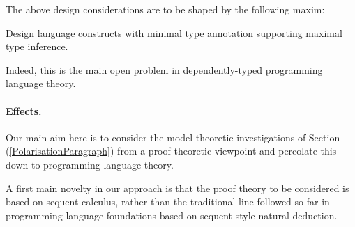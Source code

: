 \documentclass[11pt,twocolumn]{article}
\newcounter{CC}
\newenvironment{resenumerate}
  {\begin{list}{[\textbf{\arabic{CC}]}}
  {\usecounter{CC}
   \setlength{\topsep}{2pt}
   \setlength{\partopsep}{2pt}
   \setlength{\itemsep}{2.5pt}
   \setlength{\parsep}{2.5pt}
   \setlength{\leftmargin}{1.65em}
   \setlength{\labelwidth}{1.15em}
 }}
  {\end{list}}
\newcommand{\hide}[1]{}
\newcommand{\pref}[1]{\,(\ref{#1})}
\newcommand{\eg}{\emph{eg.}}
\begin{document}
\hide{
Dually, we will also:
\begin{resenumerate}\setcounter{CC}{4}
\item
  Develop programming primitives corresponding to coinduction proof
  principles.
\end{resenumerate}
These have received less attention.
}

The above design considerations are to be shaped by the following maxim:
\begin{resenumerate}\setcounter{CC}{4}%
\item
  Design language constructs with minimal type annotation supporting
  maximal type inference.
\end{resenumerate}
Indeed, this is the main open problem in dependently-typed programming language
theory.

\hide{
Finally, let us mention an intriguing possibility suggested by the
model-theoretic considerations of
Section\pref{MethodologyMathematicalUniversesParagraph}.  The indexing
structure in dependent type theory is discrete.  In many applications,
however, one is interested in indexed types that furthermore relate
structure on indices to structure on the associated indexed family of types.
The question arises as to how to:
\begin{resenumerate}\setcounter{CC}{5}%
\item
  Build idioms or language abstractions for defining and then programming
  with indexed types equipped with internal varying structure.
\end{resenumerate}
A specific motivation for this comes from the possibility of directly
programming, as opposed to having to code, presheaf structure (\eg~as is
needed in Normalisation by Evaluation~\cite{FiorePPDP}).
}

\paragraph{Effects.}
\label{ProgrammingEffectsParagraph}

Our main aim here is to consider the model-theoretic investigations of
Section\pref{PolarisationParagraph} from a proof-theoretic viewpoint and
percolate this down to programming language theory.

A first main novelty in our approach is that the proof theory to be
considered is based on sequent calculus, rather than the traditional line
followed so far in programming language foundations based on sequent-style
natural deduction.
\end{document}
